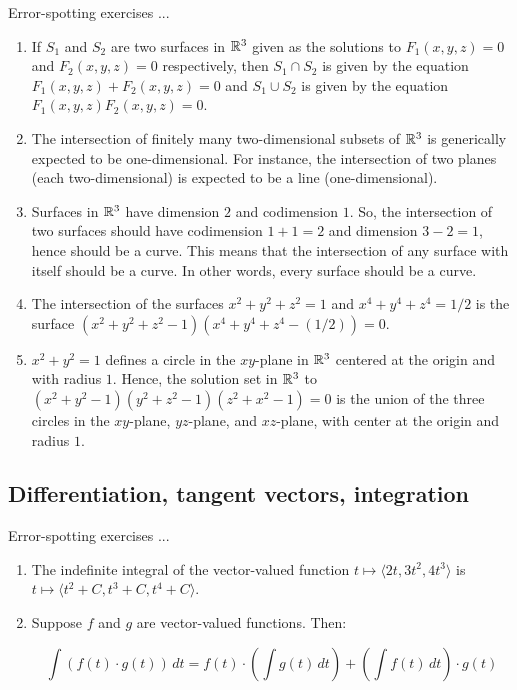 \documentclass[10pt]{amsart}
\begin{document}
Error-spotting exercises ...

\begin{enumerate}
\item If $S_1$ and $S_2$ are two surfaces in $\mathbb{R}^3$ given as the
  solutions to $F_1(x,y,z) = 0$ and $F_2(x,y,z) = 0$ respectively,
  then $S_1 \cap S_2$ is given by the equation $F_1(x,y,z) +
  F_2(x,y,z) = 0$ and $S_1 \cup S_2$ is given by the equation
  $F_1(x,y,z)F_2(x,y,z) = 0$.
\item The intersection of finitely many two-dimensional subsets of
  $\mathbb{R}^3$ is generically expected to be one-dimensional. For instance,
  the intersection of two planes (each two-dimensional) is expected to
  be a line (one-dimensional).
\item Surfaces in $\mathbb{R}^3$ have dimension $2$ and codimension $1$. So,
  the intersection of two surfaces should have codimension $1 + 1 = 2$
  and dimension $3 - 2 = 1$, hence should be a curve. This means that
  the intersection of any surface with itself should be a curve. In
  other words, every surface should be a curve.
\item The intersection of the surfaces $x^2 + y^2 + z^2 = 1$ and $x^4
  + y^4 + z^4 = 1/2$ is the surface $(x^2 + y^2 + z^2 - 1)(x^4 + y^4 +
  z^4 - (1/2)) = 0$.
\item $x^2 + y^2 = 1$ defines a circle in the $xy$-plane in $\mathbb{R}^3$
  centered at the origin and with radius $1$. Hence, the solution set
  in $\mathbb{R}^3$ to $(x^2 + y^2 - 1)(y^2 + z^2 - 1)(z^2 + x^2 - 1) = 0$ is
  the union of the three circles in the $xy$-plane, $yz$-plane, and
  $xz$-plane, with center at the origin and radius $1$.
\end{enumerate}

\subsection{Differentiation, tangent vectors, integration}

Error-spotting exercises ...

\begin{enumerate}
\item The indefinite integral of the vector-valued function $t \mapsto
  \langle 2t,3t^2,4t^3 \rangle$ is $t \mapsto \langle t^2 + C, t^3 + C, t^4 +
  C \rangle$.
\item Suppose $f$ and $g$ are vector-valued functions. Then:

  $$\int (f(t) \cdot g(t)) \, dt = f(t) \cdot \left(\int g(t) \, dt\right) + \left(\int f(t) \, dt \right) \cdot g(t)$$
\end{enumerate}
\end{document}
